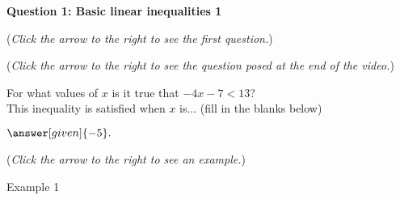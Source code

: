 \documentclass{ximera}
\begin{document}
\textbf{Question 1: Basic linear inequalities 1}
\begin{question}
\begin{flushright}
{\color{blue}(\emph{Click the arrow to the right to see the first question.})}
\end{flushright}
\begin{center}
\begin{expandable}
\begin{center}
\end{center}
\begin{flushleft}
{\color{blue}(\emph{Click the arrow to the right to see the question
posed at the end of the video.})}
\end{flushleft}
\begin{expandable}
\begin{center}
For what values of $x$ is it true that $-4x-7 <13$?  \\ This inequality is satisfied when $x$ is... (fill in the blanks below) \\
\end{center}
\begin{prompt}
\begin{center} 

 $\answer[given]{-5}.$\\
\end{center}
\end{prompt}
\begin{flushright}
{\color{blue}(\emph{Click the arrow to the right to see an example.})}
\end{flushright}
\begin{expandable}
\begin{center}
\begin{center}
Example 1
\end{center}
\end{center}
\end{expandable}
\end{expandable}
\end{expandable}
\end{center}
\end{question}
\end{document}

